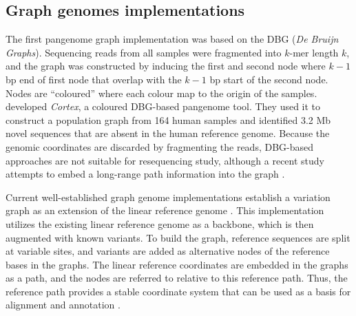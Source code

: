 \documentclass[../main.tex]{subfiles}
\begin{document}
\subsection{Graph genomes implementations}

The first pangenome graph implementation was based on the DBG (\emph{De Bruijn Graphs}). Sequencing reads from all samples were fragmented into $k$-mer length $k$, and the graph was constructed by inducing the first and second node where $k-1$ bp end of first node that overlap with the $k-1$ bp start of the second node. Nodes are “coloured” where each colour map to the origin of the samples. \citet{iqbal2012novo} developed \emph{Cortex}, a coloured DBG-based pangenome tool. They used it to construct a population graph from 164 human samples and identified 3.2 Mb novel sequences that are absent in the human reference genome. Because the genomic coordinates are discarded by fragmenting the reads, DBG-based approaches are not suitable for resequencing study, although a recent study attempts to embed a long-range path information into the graph \citep{turner2018integrating}. 

Current well-established graph genome implementations establish a variation graph as an extension of the linear reference genome \citep{eggertsson2017graphtyper,garrison2018variation,sibbesen2018accurate,rakocevic2019fast,kim2019graph}. This implementation utilizes the existing linear reference genome as a backbone, which is then augmented with known variants. To build the graph, reference sequences are split at variable sites, and variants are added as alternative nodes of the reference bases in the graphs. The linear reference coordinates are embedded in the graphs as a path, and the nodes are referred to relative to this reference path. Thus, the reference path provides a stable coordinate system that can be used as a basis for alignment and annotation \citep{garrison2018variation}. 
\end{document}
